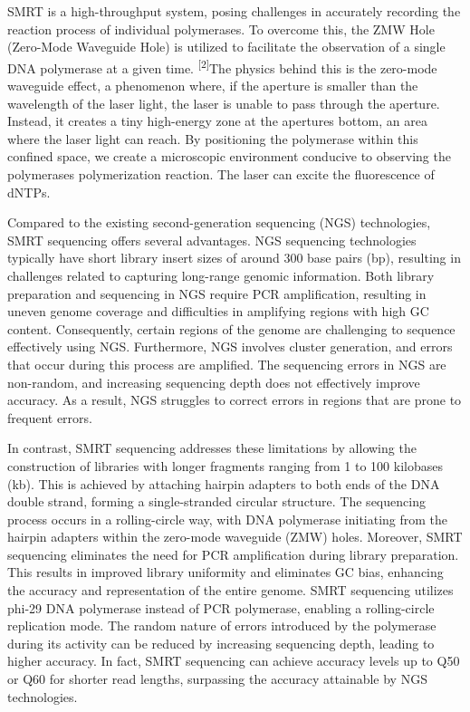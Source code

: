 \documentclass[
]{article}
\begin{document}
SMRT is a high-throughput system, posing challenges in accurately
recording the reaction process of individual polymerases. To overcome
this, the ZMW Hole (Zero-Mode Waveguide Hole) is utilized to facilitate
the observation of a single DNA polymerase at a given time.
\textsuperscript{{[}2{]}}The physics behind this is the zero-mode
waveguide effect, a phenomenon where, if the aperture is smaller than
the wavelength of the laser light, the laser is unable to pass through
the aperture. Instead, it creates a tiny high-energy zone at the
aperture\textquotesingle s bottom, an area where the laser light can
reach. By positioning the polymerase within this confined space, we
create a microscopic environment conducive to observing the
polymerase\textquotesingle s polymerization reaction. The laser can
excite the fluorescence of dNTPs.

Compared to the existing second-generation sequencing (NGS)
technologies, SMRT sequencing offers several advantages. NGS sequencing
technologies typically have short library insert sizes of around 300
base pairs (bp), resulting in challenges related to capturing long-range
genomic information. Both library preparation and sequencing in NGS
require PCR amplification, resulting in uneven genome coverage and
difficulties in amplifying regions with high GC content. Consequently,
certain regions of the genome are challenging to sequence effectively
using NGS. Furthermore, NGS involves cluster generation, and errors that
occur during this process are amplified. The sequencing errors in NGS
are non-random, and increasing sequencing depth does not effectively
improve accuracy. As a result, NGS struggles to correct errors in
regions that are prone to frequent errors.

In contrast, SMRT sequencing addresses these limitations by allowing the
construction of libraries with longer fragments ranging from 1 to 100
kilobases (kb). This is achieved by attaching hairpin adapters to both
ends of the DNA double strand, forming a single-stranded circular
structure. The sequencing process occurs in a rolling-circle way, with
DNA polymerase initiating from the hairpin adapters within the zero-mode
waveguide (ZMW) holes. Moreover, SMRT sequencing eliminates the need for
PCR amplification during library preparation. This results in improved
library uniformity and eliminates GC bias, enhancing the accuracy and
representation of the entire genome. SMRT sequencing utilizes phi-29 DNA
polymerase instead of PCR polymerase, enabling a rolling-circle
replication mode. The random nature of errors introduced by the
polymerase during its activity can be reduced by increasing sequencing
depth, leading to higher accuracy. In fact, SMRT sequencing can achieve
accuracy levels up to Q50 or Q60 for shorter read lengths, surpassing
the accuracy attainable by NGS technologies.
\end{document}
